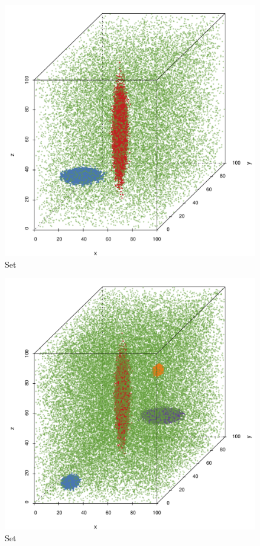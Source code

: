 \subfigvspace
\begin{subfigure}{0.23\textwidth}
	\centering
	\includegraphics[width=\textwidth, height=0.15\textheight, keepaspectratio=true]{experiment/img/datasetplot_baakman_2_60000}
	\caption{Set \baakmanTwo}
	\label{fig:experiment:multisphere:baakman2}
\end{subfigure}			
\begin{subfigure}{0.23\textwidth}
	\centering
	\includegraphics[width=\textwidth, height=0.15\textheight, keepaspectratio=true]{experiment/img/datasetplot_baakman_3_120000}
	\caption{Set \baakmanThree}
	\label{fig:experiment:multisphere:baakman3}
\end{subfigure}
